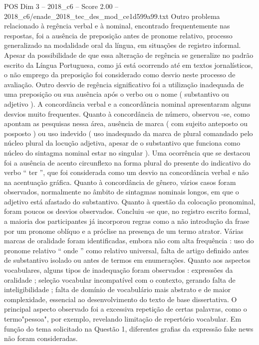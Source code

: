 \begin{textsample}{POS Dim 3 – 2018\_c6 – Score 2.00 – 2018\_c6/enade\_2018\_tec\_des\_mod\_ce1d599a99.txt}
Outro problema relacionado à regência verbal e à nominal, encontrado frequentemente nas respostas, foi a ausência de preposição antes de pronome relativo, processo generalizado na modalidade oral da língua, em situações de registro informal.
Apesar da possibilidade de que essa alteração de regência se generalize no padrão escrito da Língua Portuguesa, como já está ocorrendo até em textos jornalísticos, o não emprego da preposição foi considerado como desvio neste processo de avaliação.
Outro desvio de regência significativo foi a utilização inadequada de uma preposição ou sua ausência após o verbo ou o nome ( substantivo ou adjetivo ).
A concordância verbal e a concordância nominal apresentaram alguns desvios muito frequentes.
Quanto à concordância de número, observou -se, como apontam as pesquisas nessa área, ausência de marca ( com sujeito anteposto ou posposto ) ou uso indevido ( uso inadequado da marca de plural comandado pelo núcleo plural da locução adjetiva, apesar de o substantivo que funciona como núcleo do sintagma nominal estar no singular ).
Uma ocorrência que se destacou foi a ausência de acento circunflexo na forma plural do presente do indicativo do verbo “ ter ”, que foi considerada como um desvio na concordância verbal e não na acentuação gráfica.
Quanto à concordância de gênero, vários casos foram observados, normalmente no âmbito de sintagmas nominais longos, em que o adjetivo está afastado do substantivo.
Quanto à questão da colocação pronominal, foram poucos os desvios observados.
Concluiu -se que, no registro escrito formal, a maioria dos participantes já incorporou regras como a não introdução da frase por um pronome oblíquo e a próclise na presença de um termo atrator.
Várias marcas de oralidade foram identificadas, embora não com alta frequência : uso do pronome relativo “ onde ” como relativo universal, falta de artigo definido antes de substantivo isolado ou antes de termos em enumerações.
Quanto aos aspectos vocabulares, alguns tipos de inadequação foram observados : expressões da oralidade ; seleção vocabular incompatível com o contexto, gerando falta de inteligibilidade ; falta de domínio de vocabulário mais abstrato e de maior complexidade, essencial ao desenvolvimento do texto de base dissertativa.
O principal aspecto observado foi a excessiva repetição de certas palavras, como o termo"pessoa", por exemplo, revelando limitação de repertório vocabular.
Em função do tema solicitado na Questão 1, diferentes grafias da expressão fake news não foram consideradas.

\end{textsample}
